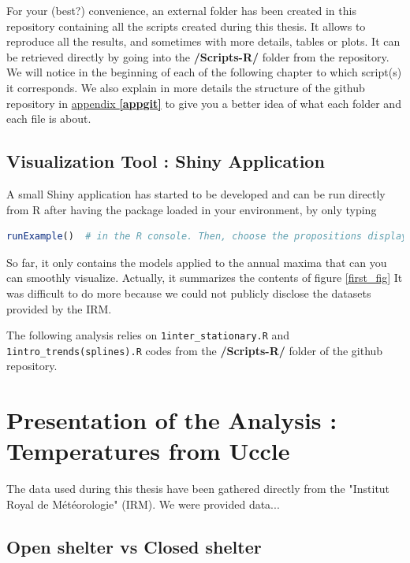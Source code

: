 \documentclass[11pt,a4paper,openany ]{book}
\begin{document}
For your (best?) convenience, an external folder has been created in this repository containing all the scripts created during this thesis. It allows to reproduce all the results, and sometimes with more details, tables or plots. It can be retrieved directly by going into the \textbf{/Scripts-R/} folder from the repository. We will notice in the beginning of each of the following chapter to which script(s) it corresponds. We also explain in more details the structure of the github repository in \hyperref[appgit]{appendix \textbf{\ref{appgit}}} to give you a better idea of what each folder and each file is about.

\subsection*{Visualization Tool : Shiny Application}

A small Shiny application has started to be developed and can be run directly from R after having the package loaded in your environment, by only typing 

\begin{center}
\begin{lstlisting}[language=R]
runExample()  # in the R console. Then, choose the propositions displayed
\end{lstlisting}
\end{center}

 So far, it only contains the models applied to the annual maxima that can you can smoothly visualize. Actually, it summarizes the contents of figure \ref{first_fig} It was difficult to do more because we could not publicly disclose the datasets provided by the IRM.



The following analysis relies on \texttt{1inter\_stationary.R} and \texttt{1intro\_trends(splines).R} codes from the \textbf{/Scripts-R/} folder of the github repository.

\section{Presentation of the Analysis : Temperatures from Uccle}

The data used during this thesis have been gathered directly from the "Institut Royal de Météorologie" (IRM). We were provided data...


\subsection{Open shelter vs Closed shelter}
\end{document}
